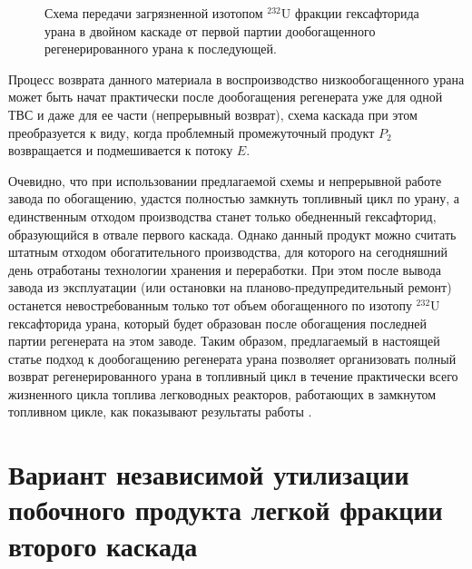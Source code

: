 \begin{figure}[ht]
  \caption{Схема передачи загрязненной изотопом $^{232}$U фракции гексафторида урана в двойном каскаде от первой партии дообогащенного регенерированного урана к последующей.}\label{P2utilizationRing}
\end{figure}

Процесс возврата данного материала в воспроизводство низкообогащенного урана может быть начат практически после дообогащения регенерата уже для одной ТВС и даже для ее части (непрерывный возврат), схема каскада при этом преобразуется к виду, когда проблемный промежуточный продукт $P_2$ возвращается и подмешивается к потоку $E$.

Очевидно, что при использовании предлагаемой схемы и непрерывной работе завода по обогащению, удастся полностью замкнуть топливный цикл по урану, а единственным отходом производства станет только обедненный гексафторид, образующийся в отвале первого каскада. Однако данный продукт можно считать штатным отходом
обогатительного производства, для которого на сегодняшний день отработаны технологии хранения и переработки. При этом после вывода завода из эксплуатации (или остановки на планово-предупредительный ремонт) останется невостребованным только тот объем обогащенного по изотопу $^{232}$U гексафторида урана, который будет образован после обогащения последней партии регенерата на этом заводе. Таким образом, предлагаемый в настоящей статье подход к дообогащению регенерата урана позволяет организовать полный возврат регенерированного урана в топливный цикл в течение практически всего жизненного цикла топлива легководных реакторов,
работающих в замкнутом топливном цикле, как показывают результаты работы \cite{nevinicaToplivnyyCiklLegkovodnogo2019}.

\section{Вариант независимой утилизации побочного продукта легкой фракции второго каскада}

